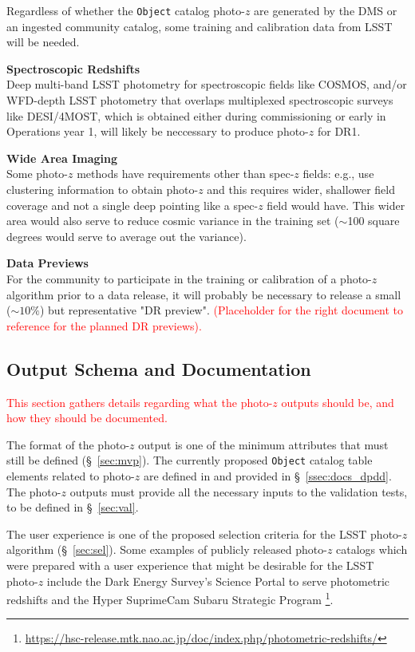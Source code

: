 \documentclass[DM,lsstdraft,toc]{lsstdoc}
\begin{document}
Regardless of whether the {\tt Object} catalog photo-$z$ are generated by the DMS or an ingested community catalog, some training and calibration data from LSST will be needed.

{\bf Spectroscopic Redshifts}\\
Deep multi-band LSST photometry for spectroscopic fields like COSMOS, and/or WFD-depth LSST photometry that overlaps multiplexed spectroscopic surveys like DESI/4MOST, which is obtained either during commissioning or early in Operations year 1, will likely be neccessary to produce photo-$z$ for DR1.

{\bf Wide Area Imaging}\\
Some photo-$z$ methods have requirements other than spec-$z$ fields: e.g., \citet{2019MNRAS.483.2801S} use clustering information to obtain photo-$z$ and this requires wider, shallower field coverage and not a single deep pointing like a spec-$z$ field would have. 
This wider area would also serve to reduce cosmic variance in the training set ($\sim$100 square degrees would serve to average out the variance).

{\bf Data Previews}\\
For the community to participate in the training or calibration of a photo-$z$ algorithm prior to a data release, it will probably be necessary to release a small ($\sim10\%$) but representative "DR preview". \textcolor{red}{(Placeholder for the right document to reference for the planned DR previews).}


\subsection{Output Schema and Documentation}\label{ssec:dp_pz}

\textcolor{red}{This section gathers details regarding what the photo-$z$ outputs should be, and how they should be documented.}

The format of the photo-$z$ output is one of the minimum attributes that must still be defined (\S~\ref{sec:mvp}). 
The currently proposed {\tt Object} catalog table elements related to photo-$z$ are defined in  and provided in \S~\ref{ssec:docs_dpdd}.
The photo-$z$ outputs must provide all the necessary inputs to the validation tests, to be defined in \S~\ref{sec:val}.

The user experience is one of the proposed selection criteria for the LSST photo-$z$ algorithm (\S~\ref{sec:sel}). 
Some examples of publicly released photo-$z$ catalogs which were prepared with a user experience that might be desirable for the LSST photo-$z$ include the Dark Energy Survey's Science Portal to serve photometric redshifts \cite{2018A&C....25...58G} and the Hyper SuprimeCam Subaru Strategic Program \cite{2018PASJ...70S...9T}\footnote{\url{https://hsc-release.mtk.nao.ac.jp/doc/index.php/photometric-redshifts/}}.
\end{document}

